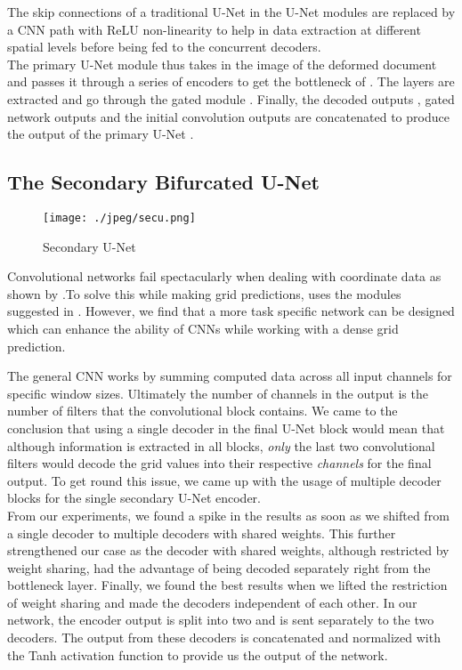 \documentclass[a4paper,conference]{IEEEtran}
\begin{document}
	The skip connections of a traditional	 U-Net in the U-Net modules are replaced by a CNN path with ReLU non-linearity to help in data extraction at different spatial levels before being fed to the concurrent decoders.
	\\
	
	The primary U-Net module thus takes in the image of the deformed document  and passes it through a series of encoders to get the bottleneck of . The layers  are extracted and go through the gated module . Finally, the decoded outputs , gated network outputs  and the initial convolution outputs  are concatenated to produce the output of the primary U-Net . 
	
	\subsection{The Secondary Bifurcated U-Net}
	\begin{figure*}[!h]
		\centering
		{	
			\texttt{[image: ./jpeg/secu.png]}
		}
		\caption{Secondary U-Net}
		\label{arch4}
	\end{figure*}
	
	Convolutional networks fail spectacularly when dealing with coordinate data as shown by \cite{coordconv}.To solve this while making grid predictions, \cite{das2019dewarpnet} uses the modules suggested in \cite{coordconv}. However, we find that a more task specific network can be designed which can enhance the ability of CNNs while working with a dense grid prediction.
	
	The general CNN works by summing computed data across all input channels for specific window sizes. Ultimately the number of channels in the output is the number of filters that the convolutional block contains. We came to the conclusion that using a single decoder in the final U-Net block would mean that although 	information is extracted in all blocks, \emph{only} the last two convolutional filters would decode the grid values into their respective \emph{channels} for the final output. To get round this issue, we came up with the usage of multiple decoder blocks for the single secondary U-Net encoder. 
	\\
	
	From our experiments, we found a spike in the results as soon as we shifted from a single decoder to multiple decoders with shared weights. This further strengthened our case as the decoder with shared weights, although restricted by weight sharing, had the advantage of being decoded separately right from the bottleneck layer. Finally, we found the best results when we lifted the restriction of weight sharing and made the decoders independent of each other. In our network, the encoder output is split into two and is sent separately to the two decoders. The output from these decoders is concatenated and normalized with the Tanh activation function to provide us the output of the network.
	\\
	
\end{document}
